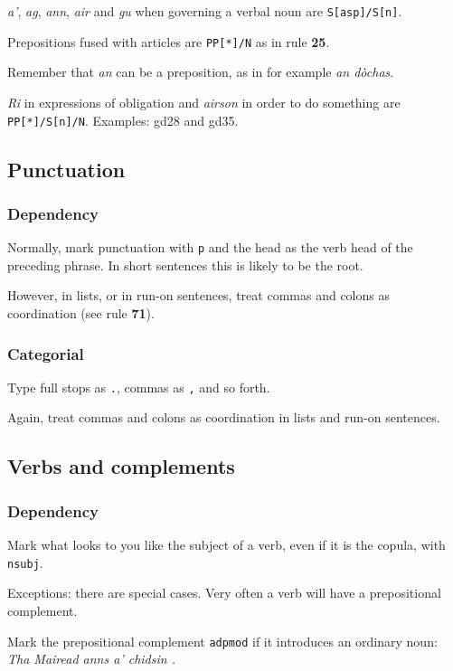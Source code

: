 \documentclass[a4paper]{article}
\begin{document}
 \textit{a'}, \textit{ag}, \textit{ann}, \textit{air} and \textit{gu} when governing a verbal noun are \texttt{S[asp]/S[n]}.

 Prepositions fused with articles are \texttt{PP[*]/N} as in rule {\bf 25}.

 Remember that \textit{an} can be a preposition, as in for example \textit{an d\`ochas}.

 \textit{Ri} in expressions of obligation and \textit{airson} in order to do something are \texttt{PP[*]/S[n]/N}. Examples: gd28 and gd35.


\subsection{Punctuation}
\subsubsection{Dependency}
 Normally, mark punctuation with \texttt{p} and the head as the verb head of the preceding phrase. In short sentences this is likely to be the root.

 However, in lists, or in run-on sentences, treat commas and colons as coordination (see rule \textbf{71}).

\subsubsection{Categorial}

 Type full stops as \texttt{.}, commas as \texttt{,} and so forth.

 Again, treat commas and colons as coordination in lists and run-on sentences.


\subsection{Verbs and complements}
\subsubsection{Dependency}
 Mark what looks to you like the subject of a verb, even if it is the copula, with \texttt{nsubj}.

Exceptions: there are special cases.
Very often a verb will have a prepositional complement.

 Mark the prepositional complement \texttt{adpmod} if it introduces an ordinary noun: \textit{Tha Mairead anns a' chidsin .}
\end{document}
